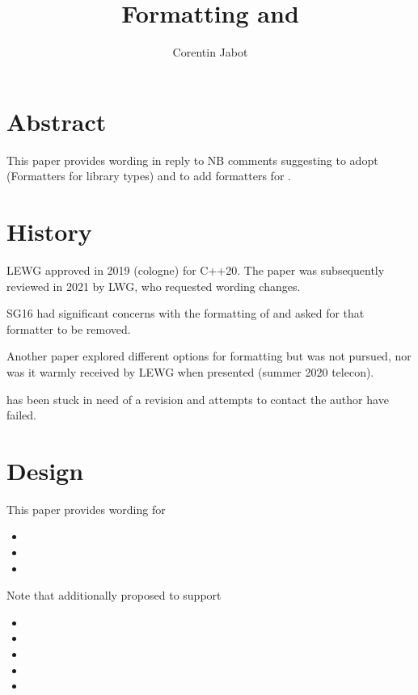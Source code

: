 \documentclass{wg21}
\title{Formatting \tcode{thread::id} and \tcode{stacktrace}}
\author{Corentin Jabot}{corentin.jabot@gmail.com}
\begin{document}
\maketitle

\section{Abstract}

This paper provides wording in reply to NB comments suggesting to adopt  (Formatters for library types)
and to add formatters for .

\section{History}

LEWG approved  in 2019 (cologne) for C++20.
The paper was subsequently reviewed in 2021 by LWG, who requested wording changes.

SG16 had significant concerns with the formatting of  and asked for that formatter to be removed.

Another paper  explored different options for formatting  but was not pursued, nor was it warmly
received by LEWG when presented (summer 2020 telecon).

 has been stuck in need of a revision and attempts to contact the author have failed.


\section{Design}

This paper provides wording for
\begin{itemize}
\item {}
\item {}
\item {}
\end{itemize}

Note that  additionally proposed to support

\begin{itemize}
\item {}
\item {}
\item {}
\item {}
\item {}
\end{itemize}
\end{document}
